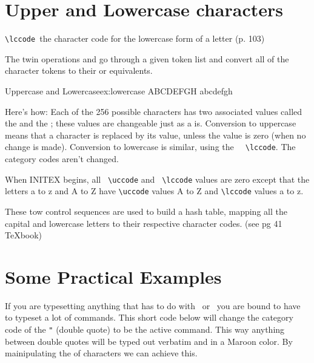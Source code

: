 \section{Upper and Lowercase characters}

\verb*+\lccode +the character code for the lowercase form of a letter (p. 103)

\DescribeMacro{\lowercase}
\DescribeMacro{\uppercase}
The twin operations \cmd{\uppercase} and \cmd{\lowercase}
go through a given token list and convert all of the character tokens to their
\cmd{\uppercase}  or  equivalents.

\begin{texexample}{Uppercase and Lowercase}{ex:lowercase} 
\uppercase{abcdefgh} 
\lowercase{ABCDEFGH}
\end{texexample}

Here's how: Each of the 256 possible characters
has two associated values called the \cmd{\uccode} and the ; these values are
changeable just as a \cmd{\catcode} is. Conversion to uppercase means that a character
is replaced by its \cmd{\uccode} value, unless the \cmd{\uccode} value is zero (when no change
is made). Conversion to lowercase is similar, using the
\verb+  \lccode+. The category codes
aren't changed. 

When INITEX begins, all \verb+ \uccode+ and \verb+ \lccode+ values are zero except
that the letters a to z and A to Z have \verb+\uccode+ values A to Z and \verb+\lccode+ values a to z.

These tow control sequences are used to build a hash table, mapping all the capital and lowercase letters to their respective character codes.
(see pg 41 TeXbook)

\section{Some Practical Examples}

If you are typesetting anything that has to do with \tex\ or \latex\ you are bound to have to typeset a lot of commands. This short code below will change the category code of the \texttt{"} (double quote) to be the active command. This way anything between double quotes will be  typed out verbatim and in a Maroon color. By mainipulating the  of characters we can achieve this.


